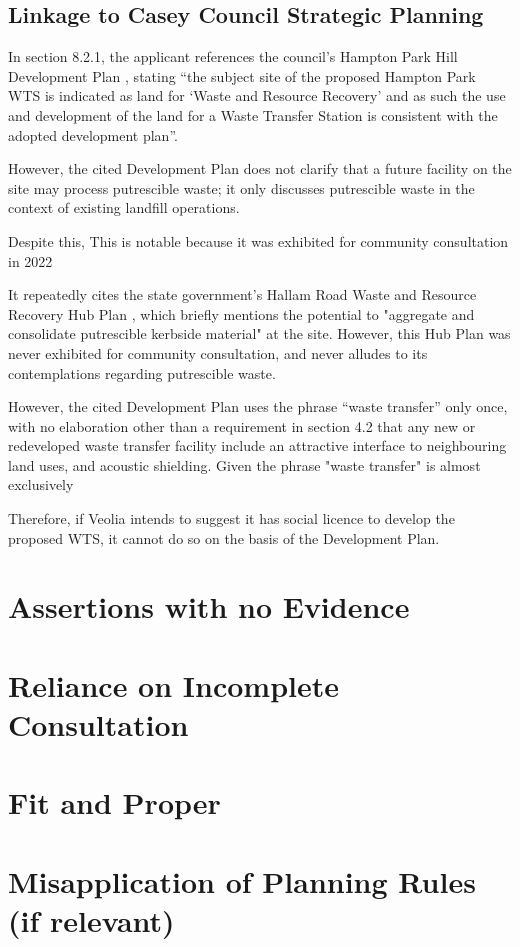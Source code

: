 \documentclass{article}
\begin{document}
\subsection{Linkage to Casey Council Strategic Planning}

In section 8.2.1, the applicant references the council’s Hampton Park Hill Development Plan \cite{hphplan}, stating “the subject site of the proposed Hampton Park WTS is indicated as land for ‘Waste and Resource Recovery’ and as such the use and development of the land for a Waste Transfer Station is consistent with the adopted development plan”.

However, the cited Development Plan does not clarify that a future facility on the site may process putrescible waste; it only discusses putrescible waste in the context of existing landfill operations. 

Despite this, This is notable because it was exhibited for community consultation in 2022 \cite{hphplan}


It repeatedly cites the state government's Hallam Road Waste and Resource Recovery Hub Plan \cite{hubplan}, which briefly mentions the potential to "aggregate and consolidate putrescible kerbside material" at the site. However, this Hub Plan was never exhibited for community consultation, and \cite{caseyhph} never alludes to its contemplations regarding putrescible waste.  \item 

However, the cited Development Plan uses the phrase “waste transfer” only once, with no elaboration other than a requirement in section 4.2 that any new or redeveloped waste transfer facility include an attractive interface to neighbouring land uses, and acoustic shielding. Given the phrase "waste transfer" is almost exclusively 

Therefore, if Veolia intends to suggest it has social licence to develop the proposed WTS, it cannot do so on the basis of the Development Plan.
 
\section{Assertions with no Evidence}

\section{Reliance on Incomplete Consultation}

\section{Fit and Proper}

\section{Misapplication of Planning Rules (if relevant)}



\printbibliography
\end{document}
